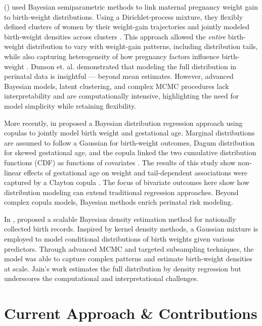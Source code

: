 \citet{dunson2008} (\citeyear{dunson2008}) used Bayesian semiparametric methods to link maternal pregnancy weight gain to birth-weight distributions. Using a Dirichlet-process mixture, they flexibly defined clusters of women by their weight-gain trajectories and jointly modeled birth-weight densities across clusters \citep{dunson2008}. This approach allowed the \emph{entire} birth-weight distribution to vary with weight-gain patterns, including distribution tails, while also capturing heterogeneity of how pregnancy factors influence birth-weight \citep{dunson2008}. Dunson et. al. demonstrated that modeling the full distribution in perinatal data is insightful — beyond mean estimates. However, advanced Bayesian models, latent clustering, and complex MCMC procedures lack interpretability and are computationally intensive, highlighting the need for model simplicity while retaining flexibility.

More recently, \citet{rathjens2023} in \citeyear{rathjens2023} proposed a Bayesian distribution regression approach using copulas to jointly model birth weight and gestational age. Marginal distributions are assumed to follow a Gaussian for birth-weight outcomes, Dagum distribution for skewed gestational age, and the copula linked the two cumulative distribution functions (CDF) as functions of covariates \citep{rathjens2023}. The results of this study show non-linear effects of gestational age on weight and tail-dependent associations were captured by a Clayton copula \citep{rathjens2023}. The focus of bivariate outcomes here show how distribution modeling can extend traditional regression approaches. Beyond complex copula models, Bayesian methods enrich perinatal risk modeling. 

In \citeyear{jain2024}, \citet{jain2024} proposed a scalable Bayesian density estimation method for nationally collected birth records. Inspired by kernel density methods, a Gaussian mixture is employed to model conditional distributions of birth weights given various predictors. Through advanced MCMC and targeted subsampling techniques, the model was able to capture complex patterns and estimate birth-weight densities at scale. Jain's work estimates the full distribution by density regression but underscores the computational and interpretational challenges.

\section{Current Approach \& Contributions}
\label{sec:ch2-current-approach}

